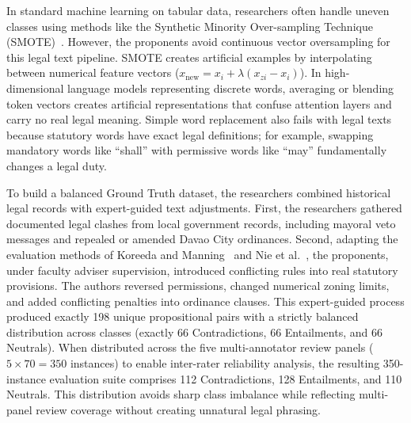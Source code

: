     In standard machine learning on tabular data, researchers often handle uneven classes using methods like the Synthetic Minority Over-sampling Technique (SMOTE)~\cite{chawla2002smote}. However, the proponents avoid continuous vector oversampling for this legal text pipeline. SMOTE creates artificial examples by interpolating between numerical feature vectors ($x_{\text{new}} = x_i + \lambda(x_{zi} - x_i)$). In high-dimensional language models representing discrete words, averaging or blending token vectors creates artificial representations that confuse attention layers and carry no real legal meaning. Simple word replacement also fails with legal texts because statutory words have exact legal definitions; for example, swapping mandatory words like ``shall'' with permissive words like ``may'' fundamentally changes a legal duty.

    To build a balanced Ground Truth dataset, the researchers combined historical legal records with expert-guided text adjustments. First, the researchers gathered documented legal clashes from local government records, including mayoral veto messages and repealed or amended Davao City ordinances. Second, adapting the evaluation methods of Koreeda and Manning~\cite{koreeda2021contract} and Nie et al.~\cite{nie2020anli}, the proponents, under faculty adviser supervision, introduced conflicting rules into real statutory provisions. The authors reversed permissions, changed numerical zoning limits, and added conflicting penalties into ordinance clauses. This expert-guided process produced exactly 198 unique propositional pairs with a strictly balanced distribution across classes (exactly 66 Contradictions, 66 Entailments, and 66 Neutrals). When distributed across the five multi-annotator review panels ($5 \times 70 = 350$ instances) to enable inter-rater reliability analysis, the resulting 350-instance evaluation suite comprises 112 Contradictions, 128 Entailments, and 110 Neutrals. This distribution avoids sharp class imbalance while reflecting multi-panel review coverage without creating unnatural legal phrasing.

